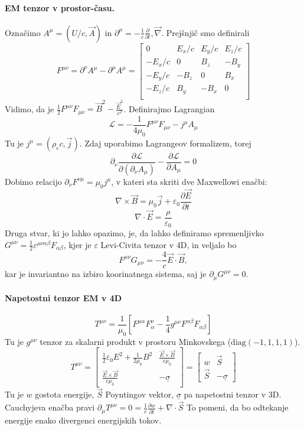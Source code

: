 \documentclass[a4paper]{article}
\newcommand{\vct}[1]{\overrightarrow{#1}}
\newcommand{\pd}[2]{\frac{\partial {#1}}{\partial {#2}}}
\begin{document}
\paragraph{EM tenzor v prostor-času.} Označimo $A^\mu = (U/c, \vct{A})$ in $\displaystyle{\partial^\mu = -\frac{1}{c}\pd{}{t}, \vct{\nabla}}$. Prejšnjič smo definirali
$$F^{\mu\nu} = \partial^\nu A^\mu - \partial^\mu A^\mu = \begin{bmatrix}
    0 & E_x/c & E_y/c & E_z/c \\
    -E_x/c & 0 & B_z & -B_y \\
    -E_y/c & -B_z & 0 & B_x \\
    -E_z/c & B_y & -B_x & 0 \\
\end{bmatrix}$$
Vidimo, da je $\displaystyle{\frac{1}{2}F^{\mu\nu}F_{\mu\nu} = \vct{B}^2 - \frac{\vct{E}^2}{c^2}}$.
Definirajmo Lagrangian $$\mathcal{L} = -\frac{1}{4\mu_0}F^{\mu\nu}F_{\mu\nu} - j^\mu A_{\mu}$$
Tu je $j^\mu = (\rho_ec, \vct{j})$. Zdaj uporabimo Lagrangeov formalizem, torej
$$\partial_\nu \pd{\mathcal{L}}{(\partial_\nu A_\mu)} - \pd{\mathcal{L}}{A_\mu} = 0$$
Dobimo relacijo $\partial_\nu F^{\nu\mu} = \mu_0j^\mu$, v kateri sta skriti dve Maxwellowi enačbi:
$$\nabla \times \vct{B} = \mu_0\vct{j} + \varepsilon_0\pd{\vct{E}}{t}$$
$$\nabla\cdot\vct{E} = \frac{\rho}{\varepsilon_0}$$
Druga stvar, ki jo lahko opazimo, je, da lahko definiramo spremenljivko $G^{\mu\nu} = \frac{1}{2}\varepsilon^{\mu\nu\alpha\beta}F_{\alpha\beta}$, kjer je $\varepsilon$ Levi-Civita tenzor v 4D, in veljalo bo
$$F^{\mu\nu} G_{\mu\nu} = -\frac{4}{c}\vct{E}\cdot\vct{B},$$
kar je invariantno na izbiro koorinatnega sistema, saj je $\partial_{\mu}G^{\mu\nu} = 0$.
\paragraph{Napetostni tenzor EM v 4D}
$$T^{\mu\nu} = \frac{1}{\mu_0}\left[F^{\mu\alpha} F^\nu_\alpha - \frac{1}{4}g^{\mu\nu}F^{\alpha\beta}F_{\alpha\beta}\right]$$
Tu je $g^{\mu\nu}$ tenzor za skalarni produkt v prostoru Minkovskega ($\mathrm{diag}(-1, 1, 1, 1)$).
$$T^{\mu\nu} = \begin{bmatrix}
    \frac{1}{2}\varepsilon_0E^2 + \frac{1}{2\mu_0}B^2 & \frac{\vct{E}\times\vct{B}}{c\mu_0} \\
    \frac{\vct{E}\times\vct{B}}{c\mu_0} & -\underline{\sigma}
\end{bmatrix} = \begin{bmatrix}
    w & \vct{S} \\
    \vct{S} & -\underline{\sigma}
\end{bmatrix}$$
Tu je $w$ gostota energije, $\vct{S}$ Poyntingov vektor, $\underline{\sigma}$ pa napetostni tenzor v $\mathrm{3D}$. \\
Cauchyjeva enačba pravi $\partial_\mu T^{\mu\nu} = 0 = \displaystyle{\frac{1}{c}\pd{w}{t} + \nabla\cdot\vct{S}}$
To pomeni, da bo odtekanje energije enako divergenci energijskih tokov.
\end{document}
